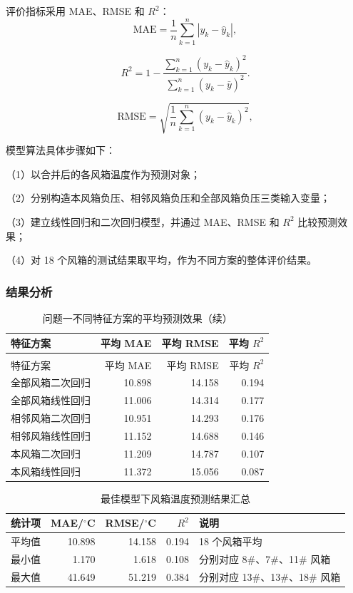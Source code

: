\documentclass[UTF8,a4paper,zihao=-4]{ctexart}
\begin{document}
评价指标采用 MAE、RMSE 和 $R^2$：
\begin{equation}
\mathrm{MAE}=\frac{1}{n}\sum_{k=1}^{n}|y_k-\hat y_k|,
\end{equation}

\begin{equation}
R^2=1-\frac{\sum_{k=1}^{n}(y_k-\hat y_k)^2}{\sum_{k=1}^{n}(y_k-\bar y)^2}.
\end{equation}

\begin{equation}
\mathrm{RMSE}=\sqrt{\frac{1}{n}\sum_{k=1}^{n}(y_k-\hat y_k)^2},
\end{equation}

模型算法具体步骤如下：

（1）以合并后的各风箱温度作为预测对象；

（2）分别构造本风箱负压、相邻风箱负压和全部风箱负压三类输入变量；

（3）建立线性回归和二次回归模型，并通过 MAE、RMSE 和 $R^2$ 比较预测效果；

（4）对 18 个风箱的测试结果取平均，作为不同方案的整体评价结果。

\subsubsection{结果分析}

\begin{longtable}{l r r r}
\caption{问题一不同特征方案的平均预测效果}\\
\toprule
特征方案 & 平均 MAE & 平均 RMSE & 平均 $R^2$ \\
\midrule
\endfirsthead
\caption[]{问题一不同特征方案的平均预测效果（续）}\\
\toprule
特征方案 & 平均 MAE & 平均 RMSE & 平均 $R^2$ \\
\midrule
\endhead
\bottomrule
\endfoot
全部风箱二次回归 & 10.898 & 14.158 & 0.194 \\
全部风箱线性回归 & 11.006 & 14.314 & 0.177 \\
相邻风箱二次回归 & 10.951 & 14.293 & 0.176 \\
相邻风箱线性回归 & 11.152 & 14.688 & 0.146 \\
本风箱二次回归 & 11.209 & 14.787 & 0.107 \\
本风箱线性回归 & 11.372 & 15.056 & 0.087 \\
\end{longtable}

\begin{table}[H]
\centering
\caption{最佳模型下风箱温度预测结果汇总}
\begin{tabular}{lrrrl}
\toprule
统计项 & MAE/$^\circ$C & RMSE/$^\circ$C & $R^2$ & 说明 \\
\midrule
平均值 & 10.898 & 14.158 & 0.194 & 18 个风箱平均 \\
最小值 & 1.170 & 1.618 & 0.108 & 分别对应 8\#、7\#、11\# 风箱 \\
最大值 & 41.649 & 51.219 & 0.384 & 分别对应 13\#、13\#、18\# 风箱 \\
\bottomrule
\end{tabular}
\end{table}
\end{document}
